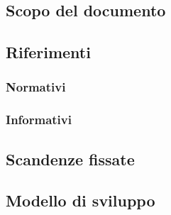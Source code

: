 \documentclass[../piano-di-progetto.tex]{subfiles}
\begin{document}
	\subsection{Scopo del documento}
  \label{subsec:scopo_del_documento}
  \subsection{Riferimenti}
  \label{subsec:riferimenti}

    \subsubsection{Normativi}
    \label{subsubsec:normativi}
    \subsubsection{Informativi}
    \label{subsubsec:informativi}
  \subsection{Scandenze fissate}
  \label{subsubsec:scadenze_fissate}
  \subsection{Modello di sviluppo}
  \label{subsec:modello_di_sviluppo}
  
  
\end{document}

